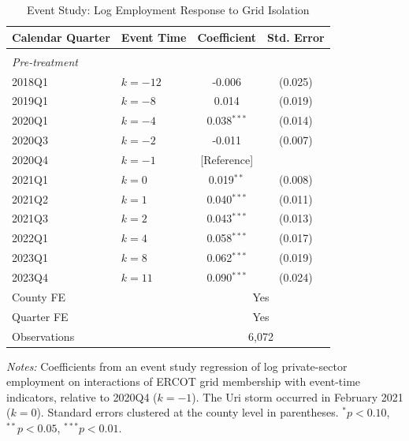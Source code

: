 \begin{table}[htbp]
\centering
\caption{Event Study: Log Employment Response to Grid Isolation}
\label{tab:event_study}
\begin{tabular}{llcc}
\hline\hline
Calendar Quarter & Event Time & Coefficient & Std. Error \\
\hline
\\[-6pt]
\multicolumn{4}{l}{\textit{Pre-treatment}} \\[3pt]
2018Q1 & $k = -12$ & -0.006 & (0.025) \\[3pt]
2019Q1 & $k = -8$ & 0.014 & (0.019) \\[3pt]
2020Q1 & $k = -4$ & 0.038$^{***}$ & (0.014) \\[3pt]
2020Q3 & $k = -2$ & -0.011 & (0.007) \\[3pt]
2020Q4 & $k = -1$ & [Reference] & \\[3pt]
2021Q1 & $k = 0$ & 0.019$^{**}$ & (0.008) \\[3pt]
2021Q2 & $k = 1$ & 0.040$^{***}$ & (0.011) \\[3pt]
2021Q3 & $k = 2$ & 0.043$^{***}$ & (0.013) \\[3pt]
2022Q1 & $k = 4$ & 0.058$^{***}$ & (0.017) \\[3pt]
2023Q1 & $k = 8$ & 0.062$^{***}$ & (0.019) \\[3pt]
2023Q4 & $k = 11$ & 0.090$^{***}$ & (0.024) \\[3pt]
\hline
County FE & & \multicolumn{2}{c}{Yes} \\
Quarter FE & & \multicolumn{2}{c}{Yes} \\
Observations & & \multicolumn{2}{c}{6,072} \\
\hline\hline
\end{tabular}
\begin{tablenotes}
\small
\item \textit{Notes:} Coefficients from an event study regression of log private-sector employment on interactions of ERCOT grid membership with event-time indicators, relative to 2020Q4 ($k=-1$). The Uri storm occurred in February 2021 ($k=0$). Standard errors clustered at the county level in parentheses. $^{*}p<0.10$, $^{**}p<0.05$, $^{***}p<0.01$.
\end{tablenotes}
\end{table}

